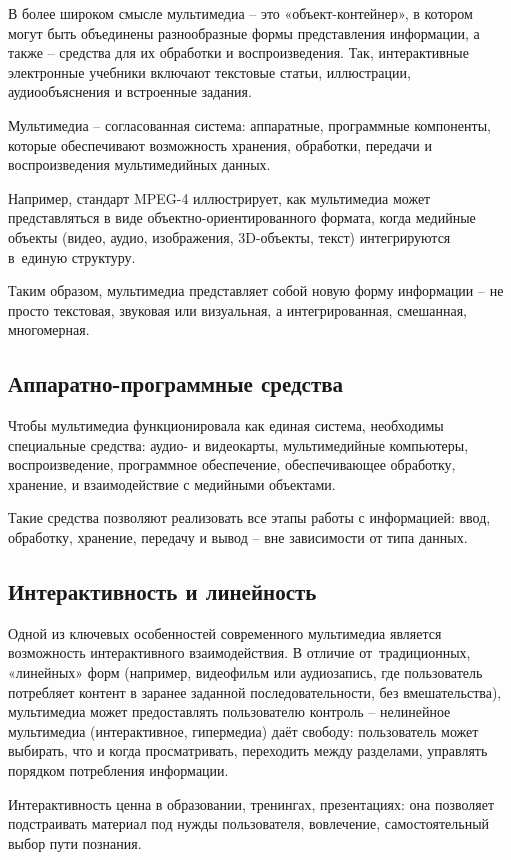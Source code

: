 \documentclass{ou}
\begin{document}
В более широком смысле мультимедиа -- это «объект-контейнер», в котором могут быть объединены разнообразные формы представления информации, а также -- средства для их обработки и воспроизведения. Так, интерактивные электронные учебники включают текстовые статьи, иллюстрации, аудиообъяснения и встроенные задания.

Мультимедиа -- согласованная система: аппаратные, программные компоненты, которые обеспечивают возможность хранения, обработки, передачи и воспроизведения мультимедийных данных. 

Например, стандарт MPEG-4 иллюстрирует, как мультимедиа может представляться в виде объектно-ориентированного формата, когда медийные объекты (видео, аудио, изображения, 3D-объекты, текст) интегрируются в~единую структуру. 

Таким образом, мультимедиа представляет собой новую форму информации -- не просто текстовая, звуковая или визуальная, а интегрированная, смешанная, многомерная.
\subsection{Аппаратно-программные средства}
Чтобы мультимедиа функционировала как единая система, необходимы специальные средства: аудио- и видеокарты, мультимедийные компьютеры, воспроизведение, программное обеспечение, обеспечивающее обработку, хранение, и взаимодействие с медийными объектами.  

Такие средства позволяют реализовать все этапы работы с информацией: ввод, обработку, хранение, передачу и вывод -- вне зависимости от типа данных.
\subsection{Интерактивность и линейность}
Одной из ключевых особенностей современного мультимедиа является возможность интерактивного взаимодействия. В отличие от~традиционных, «линейных» форм (например, видеофильм или аудиозапись, где пользователь потребляет контент в заранее заданной последовательности, без вмешательства), мультимедиа может предоставлять пользователю контроль -- нелинейное мультимедиа (интерактивное, гипермедиа) даёт свободу: пользователь может выбирать, что и когда просматривать, переходить между разделами, управлять порядком потребления информации.

Интерактивность ценна в образовании, тренингах, презентациях: она позволяет подстраивать материал под нужды пользователя, вовлечение, самостоятельный выбор пути познания. 
\end{document}
